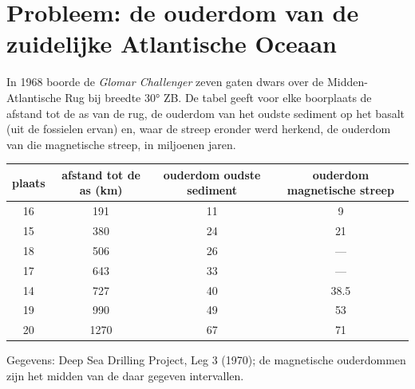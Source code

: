 \section{Probleem: de ouderdom van de zuidelijke Atlantische Oceaan}

\begin{problem}
\label{pb:g11:drift-to-spreading:1}
In 1968 boorde de \emph{Glomar Challenger} zeven gaten dwars over de
Midden-Atlantische Rug bij breedte \ang{30} ZB. De tabel geeft voor elke
boorplaats de afstand tot de as van de rug, de ouderdom van het oudste sediment
op het basalt (uit de fossielen ervan) en, waar de streep eronder werd herkend,
de ouderdom van die magnetische streep, in miljoenen jaren.

\begin{center}
\small
\begin{tabular}{|c|c|c|c|}
\hline
plaats & afstand tot de as (\unit{km}) & ouderdom oudste sediment & ouderdom magnetische streep \\ \hline
16 & 191 & 11 & 9 \\ \hline
15 & 380 & 24 & 21 \\ \hline
18 & 506 & 26 & --- \\ \hline
17 & 643 & 33 & --- \\ \hline
14 & 727 & 40 & 38.5 \\ \hline
19 & 990 & 49 & 53 \\ \hline
20 & 1270 & 67 & 71 \\ \hline
\end{tabular}

{\small Gegevens: Deep Sea Drilling Project, Leg 3 (1970); de magnetische
ouderdommen zijn het midden van de daar gegeven intervallen.}
\end{center}

\begin{center}


\end{center}
\end{problem}
